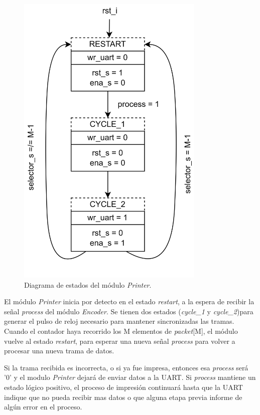 \begin{figure}[H]
	\centering
	\includegraphics[width=0.8\textwidth]{Figuras/Printer_FSMD.png}
	\centering\caption{Diagrama de estados del módulo \textit{Printer}.}
	\label{fig:Printer_FSMD}
\end{figure}

El módulo \textit{Printer} inicia por detecto en el estado \textit{restart}, a la espera de recibir la señal \textit{process} del módulo \textit{Encoder}. Se tienen dos estados (\textit{cycle\_1} y \textit{cycle\_2})para generar el pulso de reloj necesario para mantener sincronizadas las tramas. Cuando el contador haya recorrido los M elementos de \textit{packet}[M], el módulo vuelve al estado \textit{restart}, para esperar una nueva señal \textit{process} para volver a procesar una nueva trama de datos.

Si la trama recibida es incorrecta, o si ya fue impresa, entonces esa \textit{process} será '0' y el modulo \textit{Printer} dejará de enviar datos a la UART. Si \textit{process} mantiene un estado lógico positivo, el proceso de impresión continuará hasta que la UART indique que no pueda recibir mas datos o que alguna etapa previa informe de algún error en el proceso.